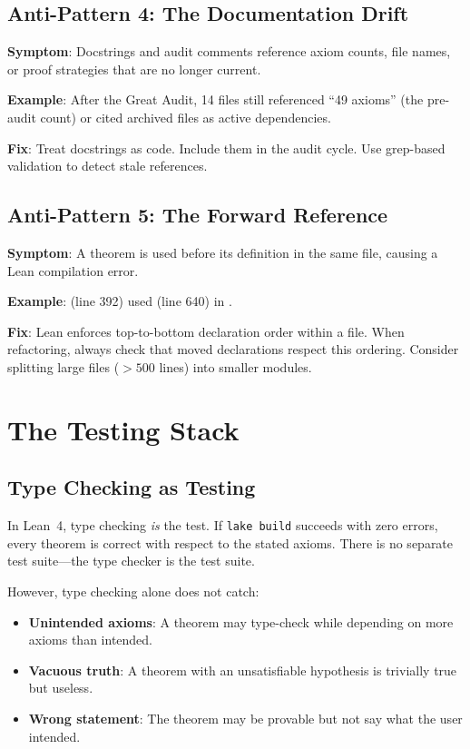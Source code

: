 \documentclass[11pt,a4paper]{article}
\begin{document}
\subsection{Anti-Pattern 4: The Documentation Drift}

\textbf{Symptom}: Docstrings and audit comments reference axiom counts,
file names, or proof strategies that are no longer current.

\textbf{Example}: After the Great Audit, 14 files still referenced
``49 axioms'' (the pre-audit count) or cited archived files as active
dependencies.

\textbf{Fix}: Treat docstrings as code. Include them in the audit cycle.
Use grep-based validation to detect stale references.

\subsection{Anti-Pattern 5: The Forward Reference}

\textbf{Symptom}: A theorem is used before its definition in the same
file, causing a Lean compilation error.

\textbf{Example}:  (line 392) used
 (line 640) in
.

\textbf{Fix}: Lean enforces top-to-bottom declaration order within
a file. When refactoring, always check that moved declarations
respect this ordering. Consider splitting large files ($>500$ lines)
into smaller modules.

\section{The Testing Stack}
\label{sec:testing}

\subsection{Type Checking as Testing}

In Lean~4, type checking \emph{is} the test. If \texttt{lake build}
succeeds with zero errors, every theorem is correct with respect to
the stated axioms. There is no separate test suite---the type checker
is the test suite.

However, type checking alone does not catch:
\begin{itemize}
  \item \textbf{Unintended axioms}: A theorem may type-check while
    depending on more axioms than intended.
  \item \textbf{Vacuous truth}: A theorem with an unsatisfiable
    hypothesis is trivially true but useless.
  \item \textbf{Wrong statement}: The theorem may be provable but
    not say what the user intended.
\end{itemize}
\end{document}
